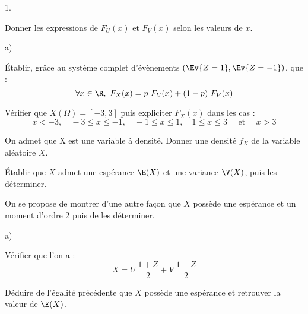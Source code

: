\documentclass[11pt]{article}%
\begin{document}
\begin{noliste}{1.}
  \setlength{\itemsep}{4mm}
\item Donner les expressions de $F_U(x)$ et $F_V(x)$ selon les valeurs
  de $x$.

  

\item
  \begin{noliste}{a)}
    \setlength{\itemsep}{2mm}
  \item Établir, grâce au système complet d'évènements $\left( \Ev{Z =
        1}, \Ev{Z = -1} \right)$, que :
    \[
    \forall x\in\R, \ F_X(x) = p \ F_U(x) + (1-p) \ F_V(x)
    \]

    
    
  \item Vérifier que $X(\Omega) = [-3,3]$ puis expliciter $F_X(x)$
    dans les cas :
    \[
    x<-3, \quad -3\leq x\leq-1, \quad -1\leq x\leq1, \quad 1 \leq x
    \leq 3 \quad \text{ et } \quad x>3
    \]

    



    
  \item On admet que X est une variable à densité. Donner une densité
    $f_{X}$ de la variable aléatoire $X$.

    	    

  \item Établir que $X$ admet une espérance $\E(X)$ et une variance
    $\V(X)$, puis les déterminer.

        
  \end{noliste}


  
\item On se propose de montrer d'une autre façon que $X$ possède une
  espérance et un moment d'ordre $2$ puis de les déterminer.

  \begin{noliste}{a)}
    \setlength{\itemsep}{2mm}
  \item Vérifier que l'on a :
    \[
    X = U \ \dfrac{1 + Z}{2} + V \ \dfrac{1-Z}{2}
    \]    

    




  \item Déduire de l'égalité précédente que $X$ possède une espérance
    et retrouver la valeur de $\E(X)$.

    	    





\end{noliste}
\end{noliste}
\end{document}
